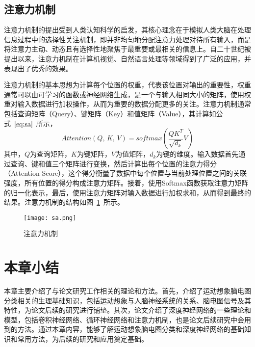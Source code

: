 \subsection{注意力机制}

注意力机制的提出受到人类认知科学的启发，其核心理念在于模拟人类大脑在处理信息过程中的选择性关注机制，即并非均匀地分配注意力处理对待所有输入，而是将注意力主动、动态且有选择性地聚焦于最重要或最相关的信息上。自二十世纪被提出以来\cite{730558}，注意力机制在计算机视觉、自然语言处理等领域得到了广泛的应用，并表现出了优秀的效果。

注意力机制的基本思想为计算每个位置的权重，代表该位置对输出的重要性，权重通常可以由可学习的函数或神经网络生成，是一个与输入相同大小的矩阵，使用权重对输入数据进行加权操作，从而为重要的数据分配更多的关注。注意力机制通常包括查询矩阵（Query）、键矩阵（Key）和值矩阵（Value），其计算如公式~\ref{eq:sa}~所示，
\begin{equation}\label{eq:sa}
    Attention(Q,\,K,\,V)=softmax(\frac{QK^{T}}{\sqrt{d_k}}V)
\end{equation}
其中，\(Q\)为查询矩阵，\(K\)为键矩阵，\(V\)为值矩阵，\(d_k\)为键的维度。输入数据首先通过查询、键和值三个矩阵进行变换，然后计算出每个位置的注意力得分（Attention Score），这个得分衡量了数据中每个位置与当前处理位置之间的关联强度，所有位置的得分构成注意力矩阵。接着，使用Softmax函数获取注意力矩阵的归一化表示，最后，使用注意力矩阵对输入数据进行加权求和，从而得到最终的结果。注意力机制的结构如图~\ref{fig:sa}~所示。
\begin{figure}
    \centering
    \texttt{[image: sa.png]}
    \caption{注意力机制}
    \label{fig:sa}
\end{figure}

\section{本章小结}

本章主要介绍了与论文研究工作相关的理论和方法。首先，介绍了运动想象脑电图分类相关的生理基础知识，包括运动想象与人脑神经系统的关系、脑电图信号及其特性，为论文后续的研究进行铺垫。其次，论文介绍了深度神经网络的一些理论和模型，包括卷积神经网络、循环神经网络和注意力机制，也是论文后续研究中会用到的方法。通过本章内容，能够了解运动想象脑电图分类和深度神经网络的基础知识和常用方法，为后续的研究和应用奠定基础。